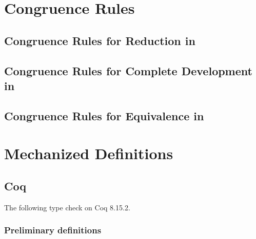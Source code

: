 \chapter{Congruence Rules} \label{app:cong}



\iffalse
The following two sections contain the full congruence rules for
the congruent closure of reduction in \lang,
and for equivalence in \CICE.
The shorthand rules \rref*{red-cong} and \rref*{equiv-cong} can then be proven
as theorems by induction on the respective congruence rules.
\fi

\section{Congruence Rules for Reduction in \lang} \label{app:cong:red}


\section{Congruence Rules for Complete Development in \lang} \label{app:cong:develop}


\section{Congruence Rules for Equivalence in \CICE} \label{app:cong:equiv}


\chapter{Mechanized \CICE Definitions} \label{app:mechanization}

\setmonofont{iosevka.ttc}

\section{Coq}

The following type check on Coq 8.15.2.

\subsection{Preliminary definitions} \label{app:mechanization:coq:prelim}

